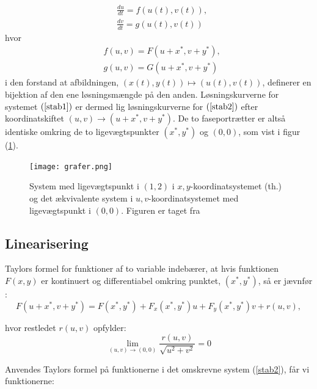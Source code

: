 \begin{equation}
\label{stab2}
    \begin{aligned}
    &\frac{du}{dt}=f(u(t),v(t)),\\ 
    &\frac{dv}{dt}=g(u(t),v(t))
    \end{aligned}
\end{equation}
hvor
\begin{equation*}
\begin{aligned}
&f(u,v)=F(u+x^*,v+y^*),\\ 
    &g(u,v)=G(u+x^*,v+y^*)
\end{aligned}
\end{equation*}
i den forstand at afbildningen, $(x(t),y(t)) \mapsto (u(t),v(t))$, definerer en bijektion af den ene løsningsmængde på den anden. Løsningskurverne for systemet $(\ref{stab1})$ er dermed lig løsningskurverne for $(\ref{stab2})$ efter koordinatskiftet $(u,v)\rightarrow(u+x^*,v+y^*)$. De to faseportrætter er altså identiske omkring de to ligevægtspunkter $(x^*,y^*)$ og $(0,0)$, som vist i figur (\ref{grafer}).
\begin{figure}[H]
    \centering
    \texttt{[image: grafer.png]}
    \caption{System med ligevægtspunkt i $(1,2)$ i $x,y$-koordinatsystemet (th.) og det ækvivalente system i $u,v$-koordinatsystemet med ligevægtspunkt i $(0,0)$. Figuren er taget fra \citep[s. 501]{EP}}
    \label{grafer}
\end{figure}

\subsection{Linearisering}
Taylors formel for funktioner af to variable indebærer, at hvis funktionen $F(x,y)$ er kontinuert og differentiabel omkring punktet, $(x^*,y^*)$, så er jævnfør \citep[s. 501]{EP}:
\begin{equation*}
F(u+x^*,v+y^*)=F(x^*,y^*)+F_x(x^*,y^*)u+F_y(x^*,y^*)v+r(u,v),
\end{equation*}

hvor restledet $r(u,v)$ opfylder:
\begin{equation}
 \lim_{(u,v)\to (0,0)} \frac{r(u,v)}{\sqrt{u^2+v^2}}=0  
 \label{restled}
\end{equation}

Anvendes Taylors formel på funktionerne i det omskrevne system (\ref{stab2}), får vi funktionerne:

